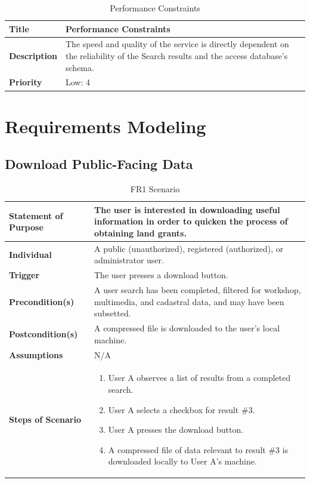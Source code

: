 \documentclass{article}
\begin{document}
\begin{table}[H]
	\caption{Performance Constraints}
	\begin{tabularx}{\textwidth}{|l|X|}
		\hline
		\textbf{Title}       & Performance Constraints                           \\ \hline
		\textbf{Description} & The speed and quality of the service is directly dependent on the reliability of the Search results and the access database's schema.      \\ \hline
		\textbf{Priority}    & Low: 4 \\ \hline
	\end{tabularx}
\end{table}

\clearpage

\section{Requirements Modeling}

\subsection{Download Public-Facing Data}

\begin{table}[H]
	\caption{FR1 Scenario}
	\begin{tabularx}{\textwidth}{|l|X|}
		\hline
		\textbf{Statement of Purpose} & The user is interested in downloading useful
			information in order to quicken the process of obtaining land grants.         \\ \hline
		\textbf{Individual}      & A public (unauthorized), registered (authorized), or 
			administrator user. \\ \hline
		\textbf{Trigger}  & The user presses a download button.               \\ \hline
		\textbf{Precondition(s)}  & A user search has been completed, filtered for 
			workshop, multimedia, and cadastral data, and may have been subsetted. 
			\\ \hline
		\textbf{Postcondition(s)}  & A compressed file is downloaded to the user's local 
			machine.  \\ \hline
		\textbf{Assumptions} & N/A \\ \hline
		\textbf{Steps of Scenario} & 
		\begin{enumerate}
				\item User A observes a list of results from a completed search.
				\item User A selects a checkbox for result \#3.
				\item User A presses the download button.
				\item A compressed file of data relevant to result \#3 is downloaded locally to User A's machine. 
			\end{enumerate}           \\  \hline
	\end{tabularx}
\end{table}
\end{document}

